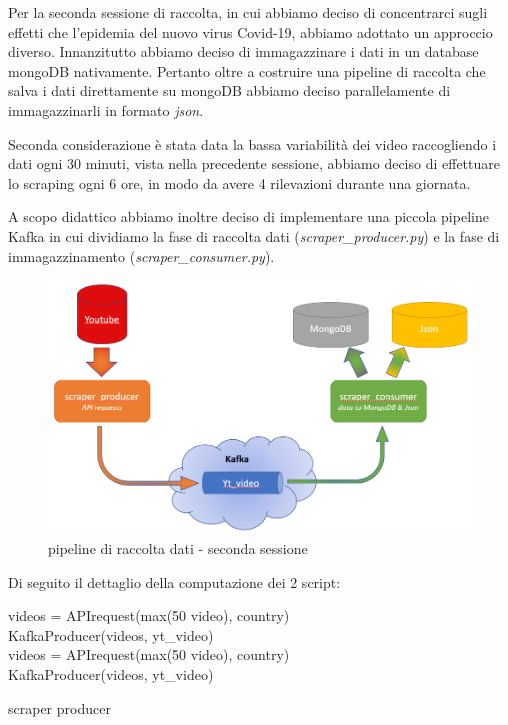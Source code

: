 Per la seconda sessione di raccolta, in cui abbiamo deciso di concentrarci sugli effetti che l'epidemia del nuovo virus Covid-19, abbiamo adottato un approccio diverso. Innanzitutto abbiamo deciso di immagazzinare i dati in un database mongoDB nativamente. Pertanto oltre a costruire una pipeline di raccolta che salva i dati direttamente su mongoDB abbiamo deciso parallelamente di immagazzinarli in formato \textit{json}. 

Seconda considerazione è stata data la bassa variabilità dei video raccogliendo i dati ogni 30 minuti, vista nella precedente sessione, abbiamo deciso di effettuare lo scraping ogni 6 ore, in modo da avere 4 rilevazioni durante una giornata. 

A scopo didattico abbiamo inoltre deciso di implementare una piccola pipeline Kafka in cui dividiamo la fase di raccolta dati (\textit{scraper\_producer.py}) e la fase di immagazzinamento (\textit{scraper\_consumer.py}). 

\begin{figure}[H]
	\centering
	\includegraphics[width=0.8\linewidth]{pics/pipeline.png}
	\caption{pipeline di raccolta dati - seconda sessione}
\end{figure}

Di seguito il dettaglio della computazione dei 2 script:

\begin{algorithm}[H]
	\nl {} {
		\nl {}
		{
			\nl videos = APIrequest(max(50 video), country)\\
			\nl KafkaProducer(videos, yt\_video) \\ 
			\nl {}
			{
				\nl videos = APIrequest(max(50 video), country) \\
				\nl KafkaProducer(videos, yt\_video) \\
			}
		}
	}
	\caption{scraper producer}
\end{algorithm}

